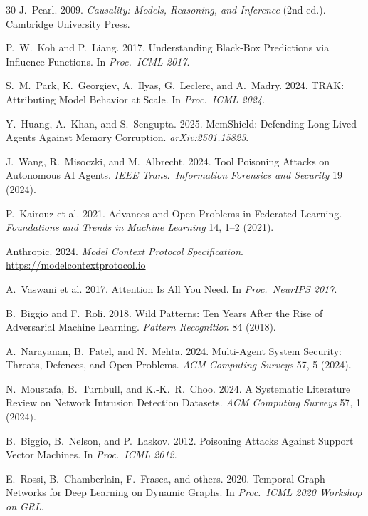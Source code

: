 \documentclass[sigconf,nonacm]{acmart}
\begin{document}
\begin{thebibliography}{30}
J.~Pearl. 2009. \textit{Causality: Models, Reasoning, and Inference}
(2nd ed.). Cambridge University Press.

P.~W.~Koh and P.~Liang. 2017. Understanding Black-Box Predictions
via Influence Functions. In \textit{Proc.\ ICML 2017}.

S.~M.~Park, K.~Georgiev, A.~Ilyas, G.~Leclerc, and A.~Madry. 2024.
TRAK: Attributing Model Behavior at Scale. In \textit{Proc.\ ICML
2024}.

Y.~Huang, A.~Khan, and S.~Sengupta. 2025. MemShield: Defending
Long-Lived Agents Against Memory Corruption.
\textit{arXiv:2501.15823}.

J.~Wang, R.~Misoczki, and M.~Albrecht. 2024. Tool Poisoning Attacks
on Autonomous AI Agents. \textit{IEEE Trans.\ Information Forensics
and Security} 19 (2024).

P.~Kairouz et al. 2021. Advances and Open Problems in Federated
Learning. \textit{Foundations and Trends in Machine Learning} 14,
1--2 (2021).

Anthropic. 2024. \textit{Model Context Protocol Specification}.
\url{https://modelcontextprotocol.io}

A.~Vaswani et al. 2017. Attention Is All You Need. In
\textit{Proc.\ NeurIPS 2017}.

B.~Biggio and F.~Roli. 2018. Wild Patterns: Ten Years After the
Rise of Adversarial Machine Learning. \textit{Pattern Recognition}
84 (2018).

A.~Narayanan, B.~Patel, and N.~Mehta. 2024. Multi-Agent System
Security: Threats, Defences, and Open Problems.
\textit{ACM Computing Surveys} 57, 5 (2024).

N.~Moustafa, B.~Turnbull, and K.-K.~R.~Choo. 2024. A Systematic
Literature Review on Network Intrusion Detection Datasets.
\textit{ACM Computing Surveys} 57, 1 (2024).

B.~Biggio, B.~Nelson, and P.~Laskov. 2012. Poisoning Attacks
Against Support Vector Machines. In \textit{Proc.\ ICML 2012}.

E.~Rossi, B.~Chamberlain, F.~Frasca, and others. 2020. Temporal
Graph Networks for Deep Learning on Dynamic Graphs.
In \textit{Proc.\ ICML 2020 Workshop on GRL}.


\end{thebibliography}
\end{document}
